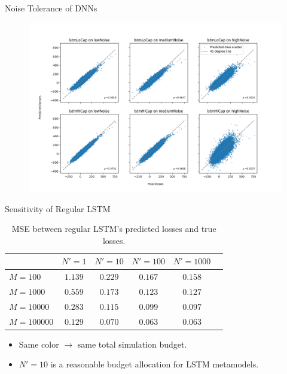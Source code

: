 \documentclass[9pt,handout]{beamer}
\begin{document}
\begin{frame}{Noise Tolerance of DNNs}

    \begin{figure}[ht!]
        \centering
        \includegraphics[width=\textwidth]{../project2/figures/qqPlots/lstmAll.png}
    \end{figure}

\end{frame}

\begin{frame}{Sensitivity of Regular LSTM}

    \begin{table}[ht!]
        \centering
        \begin{tabular}{lccccc}
            \toprule
                           & $N'=1$   & $N'=10$  & $N'=100$ & $N'=1000$\\
            \midrule
            $M = 100$      & \textcolor{color10_2}{$1.139$} & \textcolor{color10_3}{$0.229$} & \textcolor{color10_4}{$0.167$} & \textcolor{color10_5}{$0.158$} \\
            $M = 1000$     & \textcolor{color10_3}{$0.559$} & \textcolor{color10_4}{$0.173$} & \textcolor{color10_5}{$0.123$} & \textcolor{color10_6}{$0.127$} \\
            $M = 10000$    & \textcolor{color10_4}{$0.283$} & \textcolor{color10_5}{$0.115$} & \textcolor{color10_6}{$0.099$} & \textcolor{color10_7}{$0.097$} \\
            $M = 100000$   & \textcolor{color10_5}{$0.129$} & \textcolor{color10_6}{$0.070$} & \textcolor{color10_7}{$0.063$} & \textcolor{color10_8}{$0.063$} \\
            \bottomrule
        \end{tabular}
        \caption{MSE between regular LSTM's predicted losses and true losses.}
    \end{table}

    \begin{itemize}
        \item   Same color $\rightarrow$ same total simulation budget.
        \item   $N' = 10$ is a reasonable budget allocation for LSTM metamodels.
    \end{itemize}
    
\end{frame}
\end{document}
